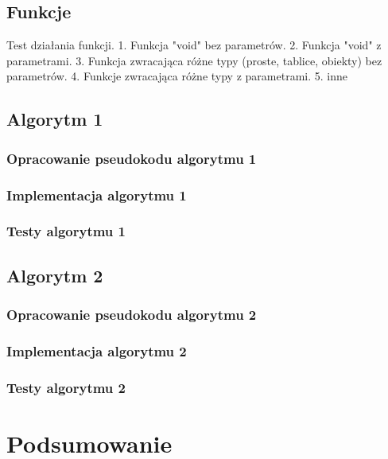 \documentclass[a4paper]{article}
\begin{document}
\subsection{Funkcje}
Test działania funkcji.
1. Funkcja "void" bez parametrów.
2. Funkcja "void" z parametrami.
3. Funkcja zwracająca różne typy (proste, tablice, obiekty) bez parametrów.
4. Funkcje zwracająca różne typy z parametrami.
5. inne

\subsection{Algorytm 1}
\subsubsection{Opracowanie pseudokodu algorytmu 1}
\subsubsection{Implementacja algorytmu 1}
\subsubsection{Testy algorytmu 1}
\subsection{Algorytm 2}
\subsubsection{Opracowanie pseudokodu algorytmu 2}
\subsubsection{Implementacja algorytmu 2}
\subsubsection{Testy algorytmu 2}


\section{Podsumowanie}


\newpage
\printbibliography[heading=bibintoc]
\end{document}
